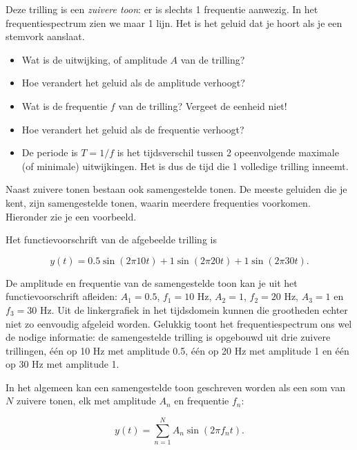 Deze trilling is een \emph{zuivere toon}: er is slechts 1 frequentie aanwezig. In het frequentiespectrum zien we maar 1 lijn. Het is het geluid dat je hoort als je een stemvork aanslaat.

\begin{oef}
\begin{itemize}
	\item Wat is de uitwijking, of amplitude $A$ van de trilling? 
	\item Hoe verandert het geluid als de amplitude verhoogt?
	\item Wat is de frequentie $f$ van de trilling? Vergeet de eenheid niet!
	\item Hoe verandert het geluid als de frequentie verhoogt?
	\item De periode is $T=1/f$ is het tijdsverschil tussen 2 opeenvolgende maximale (of minimale) uitwijkingen. Het is dus de tijd die 1 volledige trilling inneemt.
\end{itemize}
\end{oef}

Naast zuivere tonen bestaan ook samengestelde tonen. De meeste geluiden die je kent, zijn samengestelde tonen, waarin meerdere frequenties voorkomen. Hieronder zie je een voorbeeld.


Het functievoorschrift van de afgebeelde trilling is 

\begin{equation*}
y(t) = 0.5 \sin(2 \pi 10 t) + 1 \sin(2 \pi 20 t) + 1 \sin(2 \pi 30 t).
\end{equation*}

De amplitude en frequentie van de samengestelde toon kan je uit het functievoorschrift afleiden: $A_1 = 0.5$, $f_1 = 10$ Hz, $A_2 = 1$, $f_2 = 20$ Hz, $A_3 = 1$ en $f_3 = 30$ Hz. Uit de linkergrafiek in het tijdsdomein kunnen die grootheden echter niet zo eenvoudig afgeleid worden. Gelukkig toont het frequentiespectrum ons wel de nodige informatie: de samengestelde trilling is opgebouwd uit drie zuivere trillingen, \'e\'en op 10 Hz met amplitude 0.5, \'e\'en op 20 Hz met amplitude 1 en \'e\'en op 30 Hz met amplitude 1.

In het algemeen kan een samengestelde toon geschreven worden als een som van $N$ zuivere tonen, elk met amplitude $A_n$ en frequentie $f_n$:

\begin{equation*}
y(t) = \sum_{n=1}^{N} A_n \sin(2 \pi f_n t).
\end{equation*}

